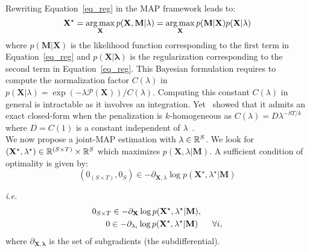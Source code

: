 Rewriting Equation~\eqref{eq_reg} in the MAP framework leads to: 
\begin{equation}
\mathbf{X}^\star = \mathop{\mathrm{arg}\,\mathrm{max}}_{\mathbf{X}}
p(\mathbf{X}, \mathbf{M}|\lambda) = \mathop{\mathrm{arg}\,\mathrm{max}}_{\mathbf{X}} p(\mathbf{M}|\mathbf{X})p(\mathbf{X}|\lambda) 
\end{equation}
where $p(\mathbf{M}|\mathbf{X})$ is the likelihood function corresponding to the first term in Equation~\eqref{eq_reg} and $p(\mathbf{X|\lambda})$ is the regularization corresponding to the second term in Equation~\eqref{eq_reg}. This Bayesian formulation requires to compute the normalization factor $C(\lambda)$ in $p(\mathbf{X}|\lambda)=\exp(-\lambda\mathcal{P}(\mathbf{X}))/C(\lambda)$. Computing this constant $C(\lambda)$ in general is intractable as it involves an integration. Yet~\cite{Figueiredo} showed that it admits an exact closed-form when the penalization is $k$-homogeneous as $C(\lambda)=D\lambda^{-ST/k}$ where $D=C(1)$ is a constant independent of $\lambda$~\cite{Figueiredo}.\\

We now propose a joint-MAP estimation with $\lambda\in\mathbb{R}^S$.
We look for $(\mathbf{X}^\star, \lambda^\star) \in\mathbb{R}^{(S\times T)} \times \mathbb{R}^{S}$ which maximizes $p(\mathbf{X}, \lambda|\mathbf{M})$. A sufficient condition of optimality is given by:
\begin{equation} \label{eq7}
(0_{(S\times T)}, 0_{S}) \in -\partial_{\mathbf{X},\lambda} \log p(\mathbf{X^\star}, \lambda^\star|\mathbf{M})
\end{equation}

\textit{i.e.}
\begin{equation} \label{eq8}
\begin{aligned}
0_{S\times T} \in -\partial_{\mathbf{X}} \log p(\mathbf{X^\star}, \lambda^\star|\mathbf{M}), \hspace{9mm} \\
0 \in -\partial_{\lambda_i} \log p(\mathbf{\mathbf{X}^\star}, \lambda^\star|\mathbf{M}) \hspace{6mm} \forall i,
\end{aligned}
\end{equation}
where $\partial_{\mathbf{X},\mathbf{\lambda}}$ is the set of subgradients (the subdifferential).\\

